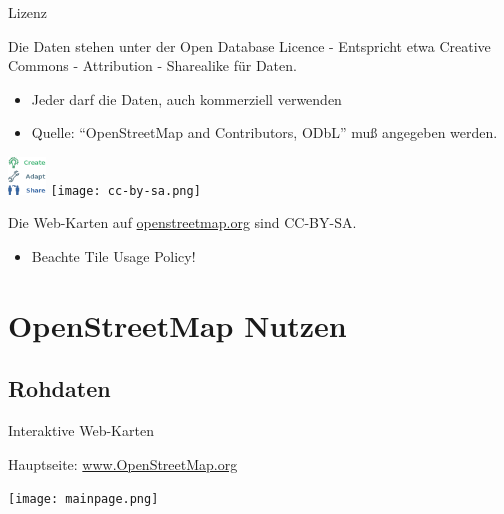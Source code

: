 \documentclass[handout]{beamer}
\begin{document}
\begin{frame}{Lizenz}

Die Daten stehen unter der Open Database Licence - Entspricht etwa Creative Commons - Attribution - Sharealike für Daten.
\begin{itemize}
  \item Jeder darf die Daten, auch kommerziell verwenden
  \item Quelle: "`OpenStreetMap and Contributors, ODbL"' muß angegeben werden.
\end{itemize}

 \begin{center}
 \includegraphics[width=1cm]{ODbL.png}
 \hspace{2cm}
 \texttt{[image: cc-by-sa.png]}
 \end{center}

\pause
Die Web-Karten auf \href{http://osm.org}{openstreetmap.org} sind CC-BY-SA.
\begin{itemize}
  \item Beachte Tile Usage Policy!
\end{itemize}


\end{frame}









\section{OpenStreetMap Nutzen}

\subsection{Rohdaten}

\begin{frame}{Interaktive Web-Karten}

Hauptseite: \href{http://osm.org}{www.OpenStreetMap.org}

 \begin{center}
 \texttt{[image: mainpage.png]}
 \end{center}



\end{frame}
\end{document}

